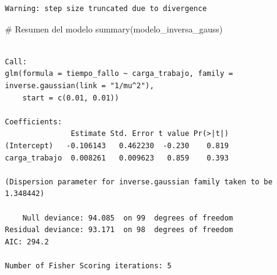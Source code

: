 \documentclass[
  letterpaper,
  DIV=11,
  numbers=noendperiod]{scrreprt}
\newenvironment{Shaded}{\begin{snugshade}}{\end{snugshade}}
\newcommand{\CommentTok}[1]{\textcolor[rgb]{0.37,0.37,0.37}{#1}}
\newcommand{\FunctionTok}[1]{\textcolor[rgb]{0.28,0.35,0.67}{#1}}
\newcommand{\NormalTok}[1]{\textcolor[rgb]{0.00,0.23,0.31}{#1}}
\begin{document}
\begin{tcolorbox}
\begin{verbatim}
Warning: step size truncated due to divergence
\end{verbatim}

\begin{Shaded}
\begin{Highlighting}[]
\CommentTok{\# Resumen del modelo}
\FunctionTok{summary}\NormalTok{(modelo\_inversa\_gauss)}
\end{Highlighting}
\end{Shaded}

\begin{verbatim}

Call:
glm(formula = tiempo_fallo ~ carga_trabajo, family = inverse.gaussian(link = "1/mu^2"), 
    start = c(0.01, 0.01))

Coefficients:
               Estimate Std. Error t value Pr(>|t|)
(Intercept)   -0.106143   0.462230  -0.230    0.819
carga_trabajo  0.008261   0.009623   0.859    0.393

(Dispersion parameter for inverse.gaussian family taken to be 1.348442)

    Null deviance: 94.085  on 99  degrees of freedom
Residual deviance: 93.171  on 98  degrees of freedom
AIC: 294.2

Number of Fisher Scoring iterations: 5
\end{verbatim}

\end{tcolorbox}
\end{document}
